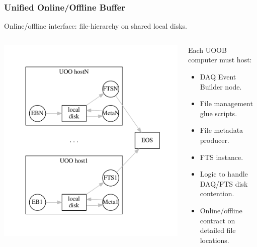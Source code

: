 \documentclass[xcolor=dvipsnames]{beamer}
\begin{document}
\begin{frame}
  \frametitle{Unified Online/Offline Buffer}

  Online/offline interface: file-hierarchy on shared local disks.  

  \begin{columns}
    \begin{column}{0.4\textwidth}
      \includegraphics[width=\textwidth,clip,trim=5mm 0 5mm 0]{uoob-join.pdf}
    \end{column}
    \begin{column}{0.6\textwidth}
      Each UOOB computer must host:
      \begin{itemize}\footnotesize
      \item DAQ Event Builder node.
      \item File management glue scripts.
      \item File metadata producer.
      \item FTS instance.
      \item Logic to handle DAQ/FTS disk contention.
      \item Online/offline contract on detailed file locations.
      \end{itemize}
    \end{column}
  \end{columns}
\end{frame}
\end{document}
